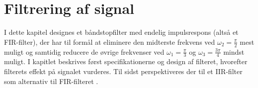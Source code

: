 \chapter{Filtrering af signal}
I dette kapitel designes et båndstopfilter med endelig impulsrespons (altså et FIR-filter), der har til formål at eliminere den midterste frekvens ved $\omega_2 = \frac{\pi}{2}$ mest muligt og samtidig reducere de øvrige frekvenser ved $\omega_1 = \frac{\pi}{3}$ og $\omega_3 = \frac{3\pi}{4}$ mindst muligt. I kapitlet beskrives først specifikationerne og design af filteret, hvorefter filterets effekt på signalet vurderes. Til sidst perspektiveres der til et IIR-filter som alternativ til FIR-filteret .



%
